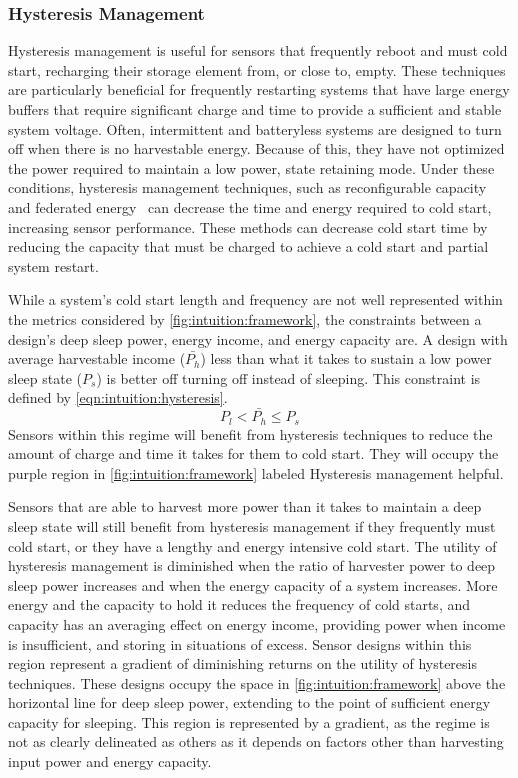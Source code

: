 \subsubsection{Hysteresis Management}
Hysteresis management is useful for sensors that frequently reboot and must cold start, recharging their storage element from, or close to, empty.
These techniques are particularly beneficial for frequently restarting systems that have large energy buffers that require significant charge and time to provide a sufficient and stable system voltage.
Often, intermittent and batteryless systems are designed to turn off when there is no harvestable energy. Because of this, they have not optimized the power required to maintain a low power, state retaining mode.
Under these conditions, hysteresis management techniques,
such as reconfigurable capacity~\cite{colinReconfigurable18} and federated energy~\cite{hesterFlicker17} can decrease the time and energy required to cold start, increasing sensor
performance.
These methods can decrease cold start time
by reducing the capacity that must be charged to achieve a cold start and partial system restart.

While a system's cold start length and frequency are not well represented within the metrics considered by \cref{fig:intuition:framework},
the constraints between a design's deep sleep power, energy income, and energy capacity are.
A design with average harvestable income ($\bar{P_h}$) less than what it takes to sustain a low power sleep state ($P_s$) is better off turning off instead of sleeping. This constraint is defined by \cref{eqn:intuition:hysteresis}.
\begin{equation}
    \label{eqn:intuition:hysteresis}
    P_l < \bar{P_h} \leq P_s
\end{equation}
Sensors within this regime will benefit from hysteresis techniques to reduce the amount of charge and time it takes for them to cold start. They will occupy the purple region in \cref{fig:intuition:framework} labeled \textsf{Hysteresis management helpful}.

Sensors that are able to harvest more power than it takes to maintain a deep sleep state will still benefit from hysteresis management if they frequently must cold start, or they have a lengthy and energy intensive cold start.
The utility of hysteresis management is diminished
when the ratio of harvester power to deep sleep power increases and when the energy capacity of a system increases.
More energy and the capacity to hold it reduces the frequency of cold starts, and capacity has an averaging effect on energy income, providing power when income is insufficient, and storing in situations of excess.
Sensor designs within this region represent a gradient of diminishing returns on the utility of hysteresis techniques.
These designs occupy the space in \cref{fig:intuition:framework} above the horizontal line for deep sleep power, extending to the point of sufficient energy capacity for sleeping.
This region is represented by a gradient, as the regime is not as clearly delineated as others as it depends on factors other than harvesting input power and energy capacity.

